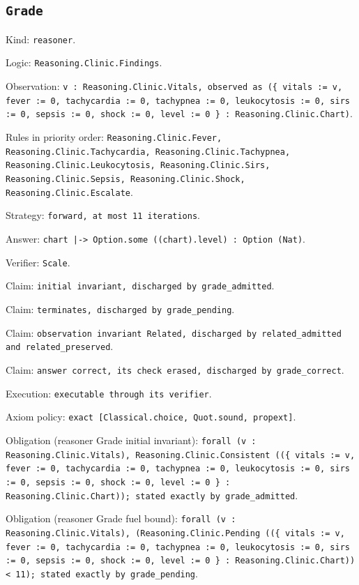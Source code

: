\documentclass[11pt]{article}
\begin{document}
\subsection*{\texttt{Grade}}
\noindent Kind: \texttt{reasoner}.\par
\noindent Logic: \texttt{Reasoning.Clinic.Findings}.\par
\noindent Observation: \texttt{v : Reasoning.Clinic.Vitals, observed as (\{ vitals := v, fever := 0, tachycardia := 0, tachypnea := 0, leukocytosis := 0, sirs := 0, sepsis := 0, shock := 0, level := 0 \} : Reasoning.Clinic.Chart)}.\par
\noindent Rules in priority order: \texttt{Reasoning.Clinic.Fever, Reasoning.Clinic.Tachycardia, Reasoning.Clinic.Tachypnea, Reasoning.Clinic.Leukocytosis, Reasoning.Clinic.Sirs, Reasoning.Clinic.Sepsis, Reasoning.Clinic.Shock, Reasoning.Clinic.Escalate}.\par
\noindent Strategy: \texttt{forward, at most 11 iterations}.\par
\noindent Answer: \texttt{chart |-> Option.some ((chart).level) : Option (Nat)}.\par
\noindent Verifier: \texttt{Scale}.\par
\noindent Claim: \texttt{initial invariant, discharged by grade\_admitted}.\par
\noindent Claim: \texttt{terminates, discharged by grade\_pending}.\par
\noindent Claim: \texttt{observation invariant Related, discharged by related\_admitted and related\_preserved}.\par
\noindent Claim: \texttt{answer correct, its check erased, discharged by grade\_correct}.\par
\noindent Execution: \texttt{executable through its verifier}.\par
\noindent Axiom policy: \texttt{exact [Classical.choice, Quot.sound, propext]}.\par
\noindent Obligation (reasoner Grade initial invariant): \texttt{forall (v : Reasoning.Clinic.Vitals), Reasoning.Clinic.Consistent ((\{ vitals := v, fever := 0, tachycardia := 0, tachypnea := 0, leukocytosis := 0, sirs := 0, sepsis := 0, shock := 0, level := 0 \} : Reasoning.Clinic.Chart)); stated exactly by grade\_admitted}.\par
\noindent Obligation (reasoner Grade fuel bound): \texttt{forall (v : Reasoning.Clinic.Vitals), (Reasoning.Clinic.Pending ((\{ vitals := v, fever := 0, tachycardia := 0, tachypnea := 0, leukocytosis := 0, sirs := 0, sepsis := 0, shock := 0, level := 0 \} : Reasoning.Clinic.Chart)) < 11); stated exactly by grade\_pending}.\par
\end{document}
